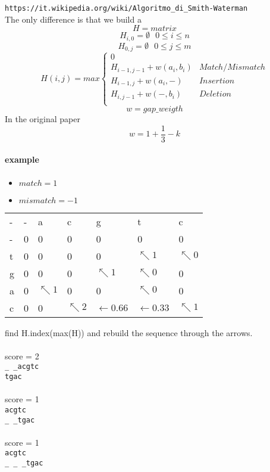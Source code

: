 \documentclass[11pt]{article}
\begin{document}
\texttt{https://it.wikipedia.org/wiki/Algoritmo\_di\_Smith-Waterman}\\
The only difference is that we build a 
\[ H = matrix\]
\[	H_{i,0} = \emptyset \ \ \ 0 \leq i \leq n \]
\[ H_{0,j} = \emptyset \ \ \ 0 \leq j \leq m  \]
\[
	H(i,j) = max 
	\begin{cases}
		0   	\\
		H_{i-1,j-1} + w(a_i, b_i) & Match/Mismatch \\
		H_{i-1,j} + w(a_i, -) & Insertion \\
		H_{i,j-1} + w(-, b_i) & Deletion \\
	\end{cases}
\]
\[ w = gap\_weigth\]
In the original paper
\[
	w = 1 + \frac{1}{3} - k 
\]

\paragraph{example\\} %
\label{par:example}

\begin{itemize}
	\item $match = 1 $
	\item $mismatch = -1$
\end{itemize}

\begin{table}[h]
\begin{tabular}{lllllll}
- & - & a & c & g & t & c \\
- & 0 & 0 & 0 & 0 & 0 & 0 \\
t & 0 & 0 & 0 & 0 & $\nwarrow 1$ & $\nwarrow 0 $\\
g & 0 & 0 & 0 & $\nwarrow 1$ & $\nwarrow 0$ & 0   \\
a & 0 & $\nwarrow 1$ & 0 & 0 & $\nwarrow 0$ & 0 \\
c & 0 & 0 & $\nwarrow 2$ & $\leftarrow 0.66$  & $\leftarrow 0.33$ & $\nwarrow 1$\\  
\end{tabular}
\end{table}

find H.index(max(H)) and rebuild the sequence through the arrows.\\
\paragraph{} %
score = 2\\
\texttt{\_ \_acgtc\\}
\texttt{tgac\\}

\paragraph{} %
score = 1\\
\texttt{acgtc\\}
\texttt{\_ \_tgac\\}

\paragraph{} %
score = 1\\
\texttt{acgtc\\}
\texttt{\_ \_ \_tgac\\}

\end{document}
